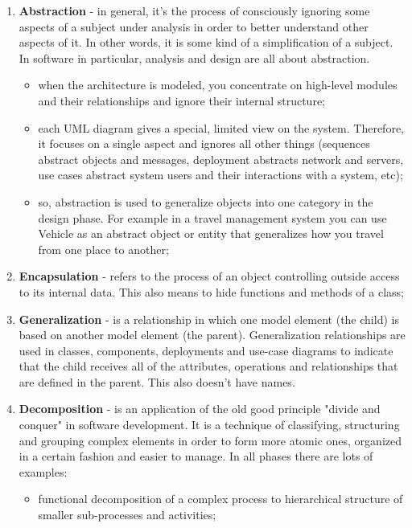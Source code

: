 \documentclass{article}
\begin{document}
			\begin{enumerate}
				\item \textbf{Abstraction} - in general, it's the process of consciously ignoring some aspects of a subject under analysis in order to better understand other aspects of it. In other words, it is some kind of a simplification of a subject. In software in particular, analysis and design are all about abstraction.
					\begin{itemize}
						\item when the architecture is modeled, you concentrate on high-level modules and their relationships and ignore their internal structure;

						\item each UML diagram gives a special, limited view on the system. Therefore, it focuses on a single aspect and ignores all other things (sequences abstract objects and messages, deployment abstracts network and servers, use cases abstract system users and their interactions with a system, etc);

						\item so, abstraction is used to generalize objects into one category in the design phase. For example in a travel management system you can use Vehicle as an abstract object or entity that generalizes how you travel from one place to another;
					\end{itemize}

				\item \textbf{Encapsulation} - refers to the process of an object controlling outside access to its internal data. This also means to hide functions and methods of a class;

				\item \textbf{Generalization} - is a relationship in which one model element (the child) is based on another model element (the parent). Generalization relationships are used in classes, components, deployments and use-case diagrams to indicate that the child receives all of the attributes, operations and relationships that are defined in the parent. This also doesn’t have names.

				\item \textbf{Decomposition} - is an application of the old good principle "divide and conquer" in software development. It is a technique of classifying, structuring and grouping complex elements in order to form more atomic ones, organized in a certain fashion and easier to manage. In all phases there are lots of examples:
					\begin{itemize}
						\item functional decomposition of a complex process to hierarchical structure of smaller sub-processes and activities;


\end{itemize}
\end{enumerate}
\end{document}
